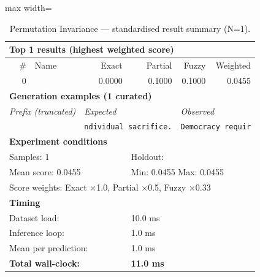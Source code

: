 \begin{table}[htbp]
\centering
\caption{Permutation Invariance — standardised result summary (N=1).}
\label{tab:permutation_invariance_summary}
\begin{adjustbox}{max width=\textwidth}
\begin{tabular}{r p{5cm} r r r r}
\toprule
\multicolumn{6}{l}{\textbf{Top 1 results (highest weighted score)}} \\
\midrule
\# & Name & Exact & Partial & Fuzzy & Weighted \\
\midrule
0 &  & 0.0000 & 0.1000 & 0.1000 & 0.0455 \\
\midrule
\multicolumn{6}{l}{\textbf{Generation examples (1 curated)}} \\
\midrule
\multicolumn{2}{l}{\textit{Prefix (truncated)}} & \multicolumn{2}{l}{\textit{Expected}} & \multicolumn{2}{l}{\textit{Observed}} \\
\midrule
\multicolumn{2}{l}{\texttt{}} & \multicolumn{2}{l}{\texttt{ndividual sacrifice.}} & \multicolumn{2}{l}{\texttt{Democracy requir}} \\
\midrule
\multicolumn{6}{l}{\textbf{Experiment conditions}} \\
\midrule
\multicolumn{3}{l}{Samples: 1} & \multicolumn{3}{l}{Holdout: } \\
\multicolumn{3}{l}{Mean score: 0.0455} & \multicolumn{3}{l}{Min: 0.0455 \quad Max: 0.0455} \\
\multicolumn{6}{l}{Score weights: Exact $\times$1.0, Partial $\times$0.5, Fuzzy $\times$0.33} \\
\midrule
\multicolumn{6}{l}{\textbf{Timing}} \\
\midrule
\multicolumn{3}{l}{Dataset load:} & \multicolumn{3}{l}{10.0 ms} \\
\multicolumn{3}{l}{Inference loop:} & \multicolumn{3}{l}{1.0 ms} \\
\multicolumn{3}{l}{Mean per prediction:} & \multicolumn{3}{l}{1.0 ms} \\
\multicolumn{3}{l}{\textbf{Total wall-clock:}} & \multicolumn{3}{l}{\textbf{11.0 ms}} \\
\bottomrule
\end{tabular}
\end{adjustbox}
\end{table}
